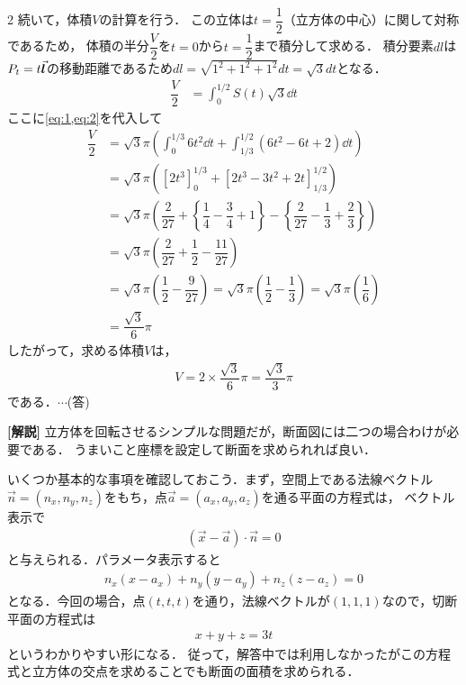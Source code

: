 \documentclass[../../main.tex]{subfiles}
\begin{document}
\begin{multicols}{2}
  続いて，体積$V$の計算を行う．
  この立体は$t=\dfrac{1}{2}$（立方体の中心）に関して対称であるため，
  体積の半分$\dfrac{V}{2}$を$t=0$から$t=\dfrac{1}{2}$まで積分して求める．
  積分要素$dl$は$P_t = t\va*{l}$の移動距離であるため$dl = \sqrt{1^2+1^2+1^2}dt = \sqrt{3}dt$となる．
  \begin{align}
    \dfrac{V}{2}
    & = \int_{0}^{1/2} S(t) \sqrt{3} \dd t
  \end{align}
  ここに\cref{eq:1,eq:2}を代入して
  \begin{align}
    \dfrac{V}{2}
    & = \sqrt{3}\pi \left( \int_{0}^{1/3} 6t^2 \dd t + \int_{1/3}^{1/2} (6t^2 - 6t + 2) \dd t \right)                                                         \\
    & = \sqrt{3}\pi \left( \left[ 2t^3 \right]_{0}^{1/3} + \left[ 2t^3 - 3t^2 + 2t \right]_{1/3}^{1/2} \right)                                                \\
    & = \sqrt{3}\pi \left( \dfrac{2}{27} + \left\{ \dfrac{1}{4} - \dfrac{3}{4} + 1 \right\} - \left\{ \dfrac{2}{27} - \dfrac{1}{3} + \dfrac{2}{3} \right\} \right)  \\
    & = \sqrt{3}\pi \left( \dfrac{2}{27} + \dfrac{1}{2} - \dfrac{11}{27} \right)                                                                                 \\
    & = \sqrt{3}\pi \left( \dfrac{1}{2} - \dfrac{9}{27} \right) = \sqrt{3}\pi \left( \dfrac{1}{2} - \dfrac{1}{3} \right) = \sqrt{3}\pi \left( \dfrac{1}{6} \right) \\
    & = \dfrac{\sqrt{3}}{6}\pi
  \end{align}
  したがって，求める体積$V$は，
  \begin{align}
    V = 2 \times \dfrac{\sqrt{3}}{6}\pi = \dfrac{\sqrt{3}}{3}\pi
  \end{align}
  である．$\cdots$(答)

  {\bf [解説]}
  立方体を回転させるシンプルな問題だが，断面図には二つの場合わけが必要である．
  うまいこと座標を設定して断面を求められれば良い．

  いくつか基本的な事項を確認しておこう．まず，空間上である法線ベクトル$\vec{n}=(n_x,n_y,n_z)$をもち，点$\vec{a}=(a_x,a_y,a_z)$を通る平面の方程式は，
  ベクトル表示で
  \begin{align}
    \left(\vec{x}-\vec{a}\right)\cdot \vec{n} = 0
  \end{align}
  と与えられる．パラメータ表示すると
  \begin{align}
    n_x(x-a_x)+n_y(y-a_y)+n_z(z-a_z)=0
  \end{align}
  となる．今回の場合，点$(t,t,t)$を通り，法線ベクトルが$(1,1,1)$なので，切断平面の方程式は
  \begin{align}
    x+y+z=3t
  \end{align}
  というわかりやすい形になる．
  従って，解答中では利用しなかったがこの方程式と立方体の交点を求めることでも断面の面積を求められる．


\end{multicols}
\end{document}
